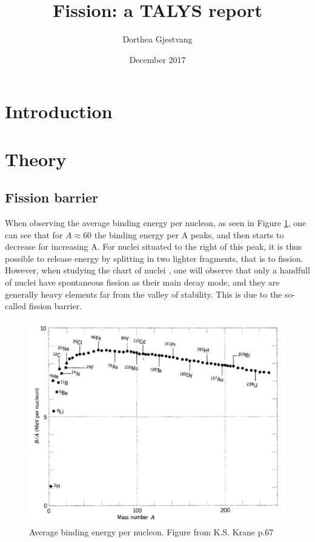 \documentclass[]{article}
\title{}
\author{}
\begin{document}
	
\title{Fission: a TALYS report}
\author{Dorthea Gjestvang }
\date{December 2017}

\maketitle

\begin{abstract}

\end{abstract}

\section{Introduction}

\section{Theory}
\subsection{Fission barrier}
When observing the average binding energy per nucleon, as seen in Figure \ref{fig:binding_energy_per_nucleon}, one can see that for $A \approx 60$ the binding energy per A peaks, and then starts to decrease for increasing A. For nuclei situated to the right of this peak, it is thus possible to release energy by splitting in two lighter fragments, that is to fission. However, when studying the chart of nuclei , one will observe that only a handfull of nuclei have spontaneous fission as their main decay mode, and they are generally heavy elements far from the valley of stability. This  is due to the so-called fission barrier. 
\par
\vspace{3mm}

\begin{figure}
	\centering
	\includegraphics[scale=0.6]{binding_energy_per_nucleon.png}
	\caption{Average binding energy per nucleon. Figure from K.S. Krane p.67 \cite{Krane1988}}
	\label{fig:binding_energy_per_nucleon}
\end{figure}
\end{document}

